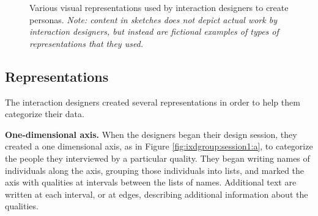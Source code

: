 \begin{figure}%
  \centering
   \caption {Various visual representations used by interaction designers to create personas. \textit{Note: content in sketches does not depict actual work by interaction designers, but instead are fictional examples of types of representations that they used.}}
   \label{fig:ixdgroup:session1}
\end{figure}%

\subsection{Representations}

The interaction designers created several representations in order to help them categorize their data. 

\textbf{One-dimensional axis.} When the designers began their design session, they created a one dimensional axis, as in Figure \ref{fig:ixdgroup:session1:a}, to categorize the people they interviewed by a particular quality. They began writing names of individuals along the axis, grouping those individuals into lists, and marked the axis with qualities at intervals between the lists of names. Additional text are written at each interval, or at edges, describing additional information about the qualities.


